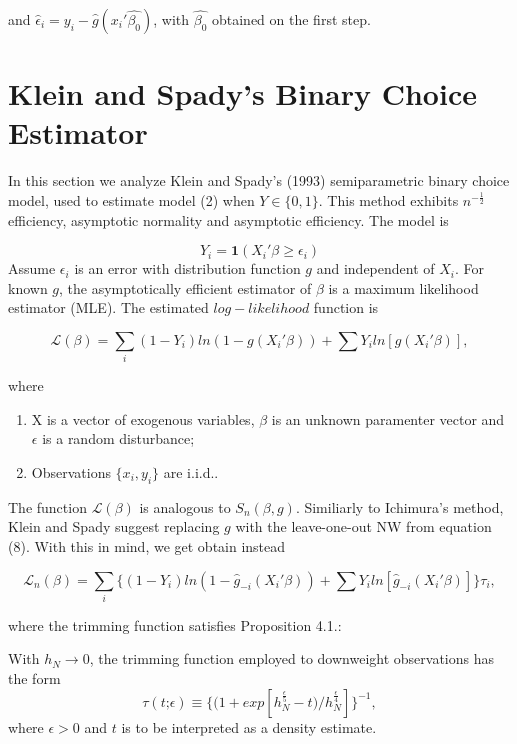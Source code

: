 \documentclass[a4paper]{article}
\begin{document}
and $\hat{\epsilon}_i = y_i - \hat{g}(x_i'\hat{\beta_0})$, with $\hat{\beta_0}$ obtained on the first step.



\section{Klein and Spady's Binary Choice Estimator} %
\label{sec:section_about_references_within_the_document}
In this section we analyze Klein and Spady's (1993) semiparametric binary choice model, used to estimate model (2) when $Y \in \{0,1\}$.   This method exhibits $n^{-\frac{1}{2}}$ efficiency, asymptotic normality and asymptotic efficiency. The model is

\begin{equation}
Y_i =  \mathbf{1}{(X_i'\beta \geq \epsilon_i)}
\end{equation}
Assume $\epsilon_i$ is an error with distribution function $g$ and independent of $X_i$. For known $g$, the asymptotically efficient estimator of $\beta$ is a maximum likelihood estimator (MLE). The estimated $log-likelihood$ function is

\begin{equation}
\mathcal{L}(\beta) = \sum_i (1 - Y_i)ln( 1 - g(X_i'\beta)) + \sum Y_iln[g(X_i'\beta)],
\end{equation}

where

\begin{enumerate}
		\item X is a vector of exogenous variables, $\beta$ is an unknown paramenter vector and $\epsilon$ is a random disturbance;
		\item Observations $\{x_i,y_i\}$ are i.i.d..
\end{enumerate}

The function $\mathcal{L}(\beta)$ is analogous to $S_n(\beta,g)$. Similiarly to Ichimura's method, Klein and Spady suggest replacing $g$ with the leave-one-out NW from equation (8). With this in mind, we get obtain instead

\begin{equation}
\mathcal{L}_n(\beta) = \sum_i \{ (1 - Y_i)ln( 1 - \hat{g}_{-i}(X_i'\beta)) + \sum Y_iln[\hat{g}_{-i}(X_i'\beta)]\}\tau_{i},
\end{equation}

where the trimming function satisfies Proposition 4.1.:

\newtheorem{proposition}{Proposition}[section]
\begin{prop}
With $h_N \rightarrow 0$, the trimming function employed to downweight observations has the form
\[ \tau(t \text{;}\epsilon) \equiv \{(1 + exp[h_{N}^{\frac{\epsilon}{5}} - t)/h_{N}^{\frac{\epsilon}{4}}]\}^{-1}, \]
where $\epsilon > 0$ and $t$ is to be interpreted as a density estimate.
\end{prop}
\end{document}
